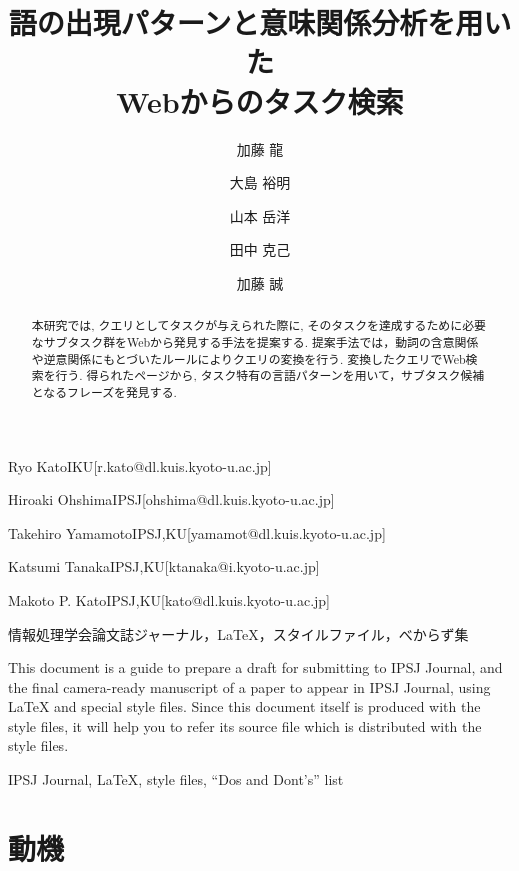 \documentclass[submit,techreq]{ipsj}
\begin{document}
\title{語の出現パターンと意味関係分析を用いた\\
Webからのタスク検索}







\author{加藤 龍}{Ryo Kato}{IKU}[r.kato@dl.kuis.kyoto-u.ac.jp]
\author{大島 裕明}{Hiroaki Ohshima}{IPSJ}[ohshima@dl.kuis.kyoto-u.ac.jp]
\author{山本 岳洋}{Takehiro Yamamoto}{IPSJ,KU}[yamamot@dl.kuis.kyoto-u.ac.jp]
\author{田中 克己}{Katsumi Tanaka}{IPSJ,KU}[ktanaka@i.kyoto-u.ac.jp]
\author{加藤 誠}{Makoto P. Kato}{IPSJ,KU}[kato@dl.kuis.kyoto-u.ac.jp]

\begin{abstract}
本研究では, クエリとしてタスクが与えられた際に, そのタスクを達成するために必要なサブタスク群をWebから発見する手法を提案する. 提案手法では，動詞の含意関係や逆意関係にもとづいたルールによりクエリの変換を行う. 変換したクエリでWeb検索を行う. 得られたページから, タスク特有の言語パターンを用いて，サブタスク候補となるフレーズを発見する. 
\end{abstract}

\begin{jkeyword}
情報処理学会論文誌ジャーナル，\LaTeX，スタイルファイル，べからず集
\end{jkeyword}

\begin{eabstract}
This document is a guide to prepare a draft for submitting to IPSJ
Journal, and the final camera-ready manuscript of a paper to appear in
IPSJ Journal, using {\LaTeX} and special style files.  Since this
document itself is produced with the style files, it will help you to
refer its source file which is distributed with the style files.
\end{eabstract}

\begin{ekeyword}
IPSJ Journal, \LaTeX, style files, ``Dos and Dont's'' list
\end{ekeyword}

\maketitle

\section{動機}
\end{document}
